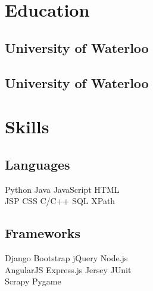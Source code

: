 \documentclass[letterpaper]{deedy-resume}
\begin{document}
\begin{minipage}[t]{0.33\textwidth}

\section{Education} 

\subsection{University of Waterloo}


\sectionspace

\subsection{University of Waterloo}


\sectionspace

\section{Skills}

\subsection{Languages}

Python \textbullet{} Java \textbullet{} JavaScript \textbullet{} HTML \\
JSP \textbullet{} CSS \textbullet{} C/C++ \textbullet{} SQL \textbullet{} XPath \\ 

\sectionspace %
\subsection{Frameworks}

Django \textbullet{} Bootstrap \textbullet{} jQuery \textbullet{} Node.js\\
AngularJS \textbullet{} Express.js \textbullet{} Jersey \textbullet{} JUnit \\ 
Scrapy \textbullet{} Pygame

\sectionspace


\end{minipage}
\end{document}
